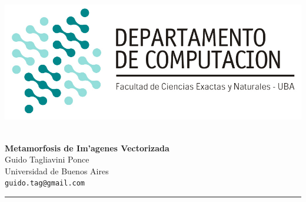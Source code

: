 \hfill \includegraphics[scale = 0.75]{imagenes/logo_dc.jpg}~\\[0.25cm]

\begin{center}
	\textbf{\Large Metamorfosis de Im'agenes Vectorizada}\\[1cm]
	{\large Guido Tagliavini Ponce\\[0.15cm]}
	Universidad de Buenos Aires\\[0.15cm]
	\texttt{guido.tag@gmail.com}\\[1cm]
\end{center}
\rule{\linewidth}{0.2mm}
